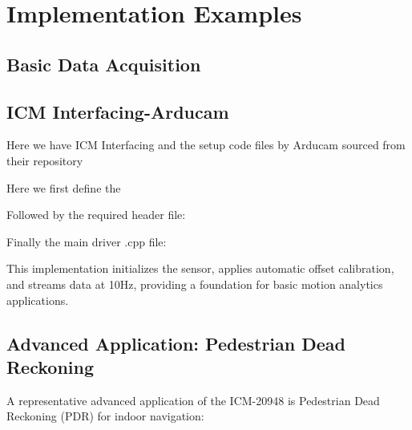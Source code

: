 \section{Implementation Examples}
\subsection{Basic Data Acquisition}

{
    \label{IMUICM20948:example}
}

\subsection{ICM Interfacing-Arducam}

Here we have ICM Interfacing and the setup code files by Arducam sourced from their repository

 \cite{ArduCAM:ICM20948}

Here we first define the  

\medskip



\medskip

Followed by the required header file:

\medskip

{
    \label{IMUICM20948H:example}
}

\medskip

Finally the main driver .cpp file:

{
    \label{IMUICM20948CPP:example}
}

\medskip

This implementation initializes the sensor, applies automatic offset calibration, and streams data at 10Hz, providing a foundation for basic motion analytics applications.\\

\subsection{Advanced Application: Pedestrian Dead Reckoning}
A representative advanced application of the ICM-20948 is Pedestrian Dead Reckoning (PDR) for indoor navigation:

